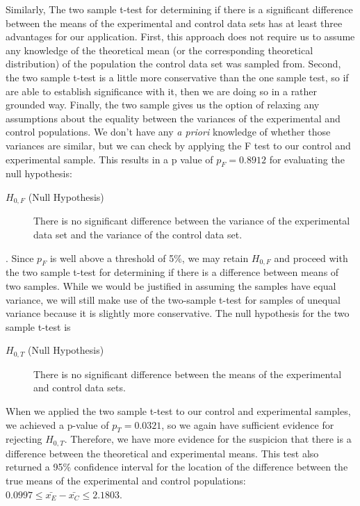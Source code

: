 \documentclass{amsart}
\begin{document}
Similarly, The two sample t-test for determining if there is a significant difference between the means of the experimental and control data sets has at least three advantages for our application. First, this approach does not require us to assume any knowledge of the theoretical mean (or the corresponding theoretical distribution) of the population the control data set was sampled from. Second, the two sample t-test is a little more conservative than the one sample test, so if are able to establish significance with it, then we are doing so in a rather grounded way. Finally, the two sample gives us the option of relaxing any assumptions about the equality between the variances of the  experimental and control populations. We don't have any \textsl{a priori} knowledge of whether those variances are similar, but we can check by applying the F test to our control and experimental sample. This results in a p value of $p_F=0.8912$ for evaluating the null hypothesis:
\begin{description}
\item[$H_{0,F}$ (Null Hypothesis)] There is no significant difference between the variance of the experimental data set and the variance of the control data set.
\end{description}.
Since $p_F$ is well above a threshold of 5\%, we may retain $H_{0,F}$ and proceed with the two sample t-test for determining if there is a difference between means of two samples. While we would be justified in assuming the samples have equal variance, we will still make use of the two-sample t-test for samples of unequal variance because it is slightly more conservative. The null hypothesis for the two sample t-test is
\begin{description}
\item[$H_{0,T}$ (Null Hypothesis)] There is no significant difference between the means of the experimental and control data sets.
\end{description}
When we applied the two sample t-test to our control and experimental samples, we achieved a p-value of $p_T=0.0321$, so we again have sufficient evidence for rejecting $H_{0,T}$. Therefore, we have more evidence for the suspicion that there is a difference between the theoretical and experimental means. This test also returned a 95\% confidence interval for the location of the difference between the true means of the experimental and control populations: $0.0997\le \bar{x_E}-\bar{x_C} \le 2.1803$.
\end{document}
